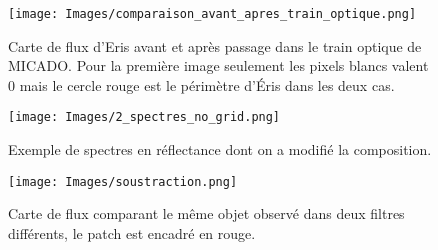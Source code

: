 \documentclass[11pt]{aa}
\begin{document}
\begin{figure}[H]
    \centering
    \texttt{[image: Images/comparaison\_avant\_apres\_train\_optique.png]}
    \caption{Carte de flux d'Eris avant et après passage dans le train optique de MICADO. Pour la première image seulement les pixels blancs valent 0 mais le cercle rouge est le périmètre d'Éris dans les deux cas.}
    \label{fig:fig1} %
\end{figure}
\begin{figure}[H]
    \centering
    \texttt{[image: Images/2\_spectres\_no\_grid.png]}
    \caption{Exemple de spectres en réflectance dont on a modifié la composition.}
    \label{fig:fig2} %
\end{figure}
\begin{figure}[H]
    \centering
    \texttt{[image: Images/soustraction.png]}
    \caption{Carte de flux comparant le même objet observé dans deux filtres différents, le patch est encadré en rouge.}
    \label{fig:fig3} %
\end{figure}
    



\end{document}
